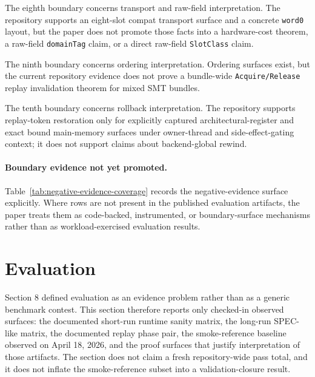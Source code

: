 \documentclass[twocolumn]{article}
\begin{document}
The eighth boundary concerns transport and raw-field interpretation. The repository supports an eight-slot compat transport surface and a concrete \texttt{word0} layout, but the paper does not promote those facts into a hardware-cost theorem, a raw-field \texttt{domainTag} claim, or a direct raw-field \texttt{SlotClass} claim.

The ninth boundary concerns ordering interpretation. Ordering surfaces exist, but the current repository evidence does not prove a bundle-wide \texttt{Acquire/Release} replay invalidation theorem for mixed SMT bundles.

The tenth boundary concerns rollback interpretation. The repository supports replay-token restoration only for explicitly captured architectural-register and exact bound main-memory surfaces under owner-thread and side-effect-gating context; it does not support claims about backend-global rewind.



\paragraph{Boundary evidence not yet promoted.}
Table~\ref{tab:negative-evidence-coverage} records the negative-evidence surface explicitly. Where rows are not present in the published evaluation artifacts, the paper treats them as code-backed, instrumented, or boundary-surface mechanisms rather than as workload-exercised evaluation results.




\section{Evaluation}

Section 8 defined evaluation as an evidence problem rather than as a generic benchmark contest. This section therefore reports only checked-in observed surfaces: the documented short-run runtime sanity matrix, the long-run SPEC-like matrix, the documented replay phase pair, the smoke-reference baseline observed on April 18, 2026, and the proof surfaces that justify interpretation of those artifacts. The section does not claim a fresh repository-wide pass total, and it does not inflate the smoke-reference subset into a validation-closure result.
\end{document}
